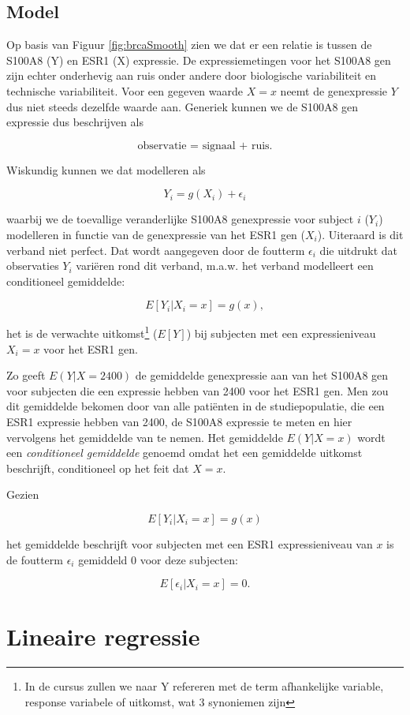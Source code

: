 \documentclass[
  12pt,dutch]{book}
\theoremstyle{definition}
\theoremstyle{definition}
\theoremstyle{definition}
\theoremstyle{definition}
\theoremstyle{remark}
\begin{document}
\subsection{Model}\label{model}

Op basis van Figuur \ref{fig:brcaSmooth} zien we dat er een relatie is tussen de S100A8 (Y) en ESR1 (X) expressie.
De expressiemetingen voor het S100A8 gen zijn echter onderhevig aan ruis onder andere door biologische variabiliteit en technische variabiliteit.
Voor een gegeven waarde \(X=x\) neemt de genexpressie \(Y\) dus niet steeds dezelfde waarde aan.
Generiek kunnen we de S100A8 gen expressie dus beschrijven als

\[\text{observatie = signaal + ruis.}\]

Wiskundig kunnen we dat modelleren als

\[Y_i=g(X_i)+\epsilon_i\]

waarbij we de toevallige veranderlijke S100A8 genexpressie voor subject \(i\) (\(Y_i\)) modelleren in functie van de genexpressie van het ESR1 gen (\(X_i\)). Uiteraard is dit verband niet perfect. Dat wordt aangegeven door de foutterm \(\epsilon_i\) die uitdrukt dat observaties \(Y_i\) variëren rond dit verband, m.a.w.
het verband modelleert een conditioneel gemiddelde:

\[E[Y_i|X_i=x]=g(x),\]

het is de verwachte uitkomst\footnote{In de cursus zullen we naar Y refereren met de term afhankelijke variable, response variabele of uitkomst, wat 3 synoniemen zijn} (\(E[Y]\)) bij subjecten met een expressieniveau \(X_i=x\) voor het ESR1 gen.

Zo geeft \(E(Y|X=2400)\) de gemiddelde genexpressie aan van het S100A8 gen voor subjecten die een expressie hebben van 2400 voor het ESR1 gen.
Men zou dit gemiddelde bekomen door van alle patiënten in de studiepopulatie, die een ESR1 expressie hebben van 2400, de S100A8 expressie te meten en hier vervolgens het gemiddelde van te nemen.
Het gemiddelde \(E(Y|X=x)\) wordt
een \emph{conditioneel gemiddelde} genoemd omdat het een gemiddelde
uitkomst beschrijft, conditioneel op het feit dat \(X=x\).

Gezien

\[E[Y_i|X_i=x]=g(x)\]

het gemiddelde beschrijft voor subjecten met een ESR1 expressieniveau van \(x\) is de foutterm \(\epsilon_i\) gemiddeld 0 voor deze subjecten:

\[E[\epsilon_i\vert X_i=x]=0.\]

\section{Lineaire regressie}\label{lineaire-regressie}
\end{document}
